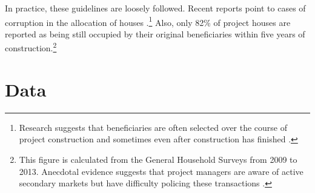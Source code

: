 \documentclass[12pt]{article}
\begin{document}
In practice, these guidelines are loosely followed.  Recent reports point to cases of corruption in the allocation of houses \citep{seriq}.\footnote{Research suggests that beneficiaries are often selected over the course of project construction and sometimes even after construction has finished \citep{seriq}.}  Also, only 82\% of project houses are reported as being still occupied by their original beneficiaries within five years of construction.\footnote{This figure is calculated from the General Household Surveys from 2009 to 2013. Anecdotal evidence suggests that project managers are aware of active secondary markets but have difficulty policing these transactions \citep{resale}.} 









\section{Data}\label{section:data}
\end{document}
